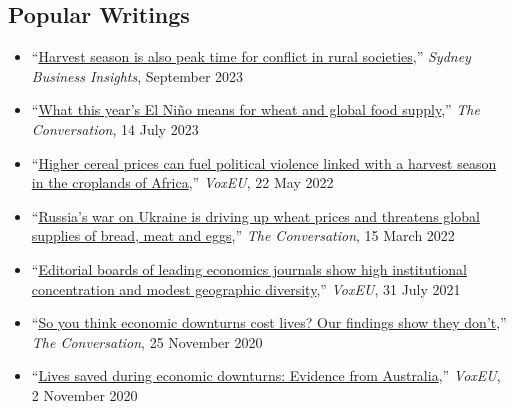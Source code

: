 \documentclass[10pt]{article}
\begin{document}
	\subsection*{Popular Writings}
	\begin{itemize}
		\item ``\href{https://sbi.sydney.edu.au/harvest-season-is-also-peak-time-for-conflict-in-rural-societies}{Harvest season is also peak time for conflict in rural societies},'' \textit{Sydney Business Insights}, September 2023 
		\item ``\href{https://theconversation.com/what-this-years-el-nino-means-for-wheat-and-global-food-supply-209386}{What this year's El Niño means for wheat and global food supply},'' \textit{The Conversation}, 14 July 2023
		\item ``\href{https://voxeu.org/article/rising-cereal-prices-and-political-violence-croplands-africa}{Higher cereal prices can fuel political violence linked with a harvest season in the croplands of Africa},'' \textit{VoxEU}, 22 May 2022
		\item ``\href{https://theconversation.com/russias-war-on-ukraine-is-driving-up-wheat-prices-and-threatens-global-supplies-of-bread-meat-and-eggs-178879}{Russia’s war on Ukraine is driving up wheat prices and threatens global supplies of bread, meat and eggs},'' \textit{The Conversation}, 15 March 2022
		\item ``\href{https://voxeu.org/article/geographic-diversity-economics-journals-editorial-boards}{Editorial boards of leading economics journals show high institutional concentration and modest geographic diversity},'' \textit{VoxEU}, 31 July 2021
		\item ``\href{https://theconversation.com/so-you-think-economic-downturns-cost-lives-our-findings-show-they-dont-149711}{So you think economic downturns cost lives? Our findings show they don't},'' \textit{The Conversation}, 25 November 2020
		\item ``\href{https://voxeu.org/article/lives-saved-during-economic-downturns}{Lives saved during economic downturns: Evidence from Australia},'' \textit{VoxEU}, 2 November 2020
	\end{itemize}
	
\end{document}
